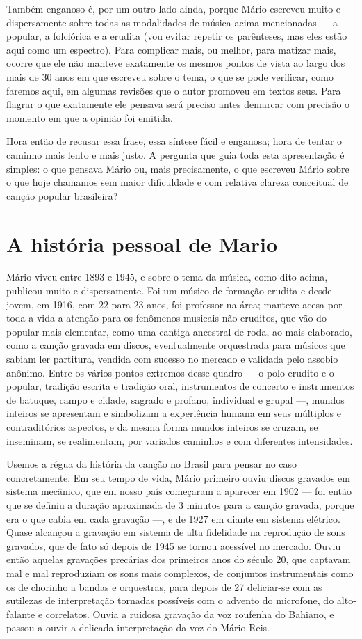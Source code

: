 Também enganoso é, por um outro lado ainda, porque Mário escreveu muito
e dispersamente sobre todas as modalidades de música acima mencionadas
--- a popular, a folclórica e a erudita (vou evitar repetir os
parênteses, mas eles estão aqui como um espectro). Para complicar mais,
ou melhor, para matizar mais, ocorre que ele não manteve exatamente os
mesmos pontos de vista ao largo dos mais de 30 anos em que escreveu
sobre o tema, o que se pode verificar, como faremos aqui, em algumas
revisões que o autor promoveu em textos seus. Para flagrar o que
exatamente ele pensava será preciso antes demarcar com precisão o
momento em que a opinião foi emitida.

Hora então de recusar essa frase, essa síntese fácil e enganosa; hora de
tentar o caminho mais lento e mais justo. A pergunta que guia toda esta
apresentação é simples: o que pensava Mário ou, mais precisamente, o que
escreveu Mário sobre o que hoje chamamos sem maior dificuldade e com
relativa clareza conceitual de canção popular brasileira?

\section{A história pessoal de Mario}

Mário viveu entre 1893 e 1945, e sobre o tema da música, como dito
acima, publicou muito e dispersamente. Foi um músico de formação erudita
e desde jovem, em 1916, com 22 para 23 anos, foi professor na área;
manteve acesa por toda a vida a atenção para os fenômenos musicais
não-eruditos, que vão do popular mais elementar, como uma cantiga
ancestral de roda, ao mais elaborado, como a canção gravada em discos,
eventualmente orquestrada para músicos que sabiam ler partitura, vendida
com sucesso no mercado e validada pelo assobio anônimo. Entre os vários
pontos extremos desse quadro --- o polo erudito e o popular, tradição
escrita e tradição oral, instrumentos de concerto e instrumentos de
batuque, campo e cidade, sagrado e profano, individual e grupal ---,
mundos inteiros se apresentam e simbolizam a experiência humana em seus
múltiplos e contraditórios aspectos, e da mesma forma mundos inteiros se
cruzam, se inseminam, se realimentam, por variados caminhos e com
diferentes intensidades.

Usemos a régua da história da canção no Brasil para pensar no caso
concretamente. Em seu tempo de vida, Mário primeiro ouviu discos
gravados em sistema mecânico, que em nosso país começaram a aparecer em
1902 --- foi então que se definiu a duração aproximada de 3 minutos para
a canção gravada, porque era o que cabia em cada gravação ---, e de 1927
em diante em sistema elétrico. Quase alcançou a gravação em sistema de
alta fidelidade na reprodução de sons gravados, que de fato só depois de
1945 se tornou acessível no mercado. Ouviu então aquelas gravações
precárias dos primeiros anos do século 20, que captavam mal e mal
reproduziam os sons mais complexos, de conjuntos instrumentais como os
de chorinho a bandas e orquestras, para depois de 27 deliciar-se com as
sutilezas de interpretação tornadas possíveis com o advento do
microfone, do alto-falante e correlatos. Ouvia a ruidosa gravação da voz
roufenha do Bahiano, e passou a ouvir a delicada interpretação da voz do
Mário Reis.

